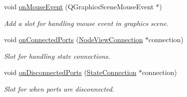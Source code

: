 \begin{DoxyCompactItemize}
void \mbox{\hyperlink{classrev_1_1_view_1_1_animation_node_widget_a0211423edc17fbe37b72067c33b4dfca}{on\+Mouse\+Event}} (Q\+Graphics\+Scene\+Mouse\+Event $\ast$)
\begin{DoxyCompactList}\small\item\em Add a slot for handling mouse event in graphics scene. \end{DoxyCompactList}\item 
\mbox{\label{classrev_1_1_view_1_1_animation_node_widget_a3abdd071a7f19bac4c8a1c009dc9333f}} 
void \mbox{\hyperlink{classrev_1_1_view_1_1_animation_node_widget_a3abdd071a7f19bac4c8a1c009dc9333f}{on\+Connected\+Ports}} (\mbox{\hyperlink{classrev_1_1_view_1_1_node_view_connection}{Node\+View\+Connection}} $\ast$connection)
\begin{DoxyCompactList}\small\item\em Slot for handling state connections. \end{DoxyCompactList}\item 
\mbox{\label{classrev_1_1_view_1_1_animation_node_widget_a77fa7ba497d5ac648b50e6d53a876509}} 
void \mbox{\hyperlink{classrev_1_1_view_1_1_animation_node_widget_a77fa7ba497d5ac648b50e6d53a876509}{on\+Disconnected\+Ports}} (\mbox{\hyperlink{classrev_1_1_state_connection}{State\+Connection}} $\ast$connection)
\begin{DoxyCompactList}\small\item\em Slot for when ports are disconnected. \end{DoxyCompactList}\end{DoxyCompactItemize}
